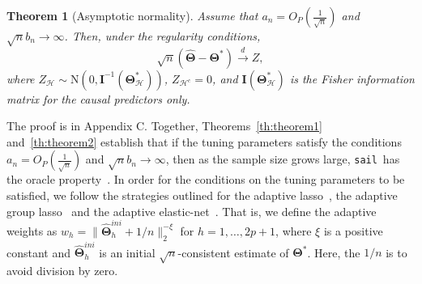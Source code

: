 \documentclass[12pt,letter]{article}\usepackage[]{graphicx}\usepackage[]{color}
\newtheorem{theorem}{Theorem}
\newtheorem{proposition}{Proposition}
\newcommand{\sail}{\texttt{sail}}
\newcommand{\bTheta}{\boldsymbol{\Theta}}
\newcommand{\btheta}{\boldsymbol{\theta}}
\begin{document}
\begin{theorem}[Asymptotic normality] \label{th:theorem2}
Assume that $a_n = O_P(\frac{1}{\sqrt{n}})$ and $\sqrt{n}b_n \to \infty$. Then, under the regularity conditions, 
\begin{equation}
\sqrt{n}\left(\widehat{\bTheta}-\bTheta^{*}\right) \stackrel{d}{\rightarrow} Z,
\end{equation}
where $Z_{\mathcal{H}} \sim \mathrm{N}\left(0, \mathbf{I}^{-1}\left(\boldsymbol{\Theta}_{\mathcal{H}}^{*}\right) \right)$, $Z_{\mathcal{H}^{c}}=0$, and $\mathbf{I}\left(\boldsymbol{\Theta}_{\mathcal{H}}^{*}\right)$ is the Fisher information matrix for the causal predictors only. 
\end{theorem}
The proof is in Appendix C. Together, Theorems~\eqref{th:theorem1} and~\eqref{th:theorem2} establish that if the tuning parameters satisfy the conditions $a_n = O_P(\frac{1}{\sqrt{n}})$ and $\sqrt{n}b_n \to \infty$, then as the sample size grows large, \sail ~has the oracle property~\citep{fan2001variable}. In order for the conditions on the tuning parameters to be satisfied, we follow the strategies outlined for the adaptive lasso~\citep{zou2006adaptive}, the adaptive group lasso~\citep{nardi2008asymptotic} and the adaptive elastic-net~\citep{zou2009adaptive}. That is, we define the adaptive weights as $w_h = \| \widehat{\bTheta}_h^{ini} + 1/n \|_2^{-\xi}$ for $h=1, \ldots, 2p+1$, where $\xi$ is a positive constant and $\widehat{\bTheta}_h^{ini}$ is an initial $\sqrt{n}$-consistent estimate of $\bTheta^*$. Here, the $1/n$ is to avoid division by zero. 

\end{document}
